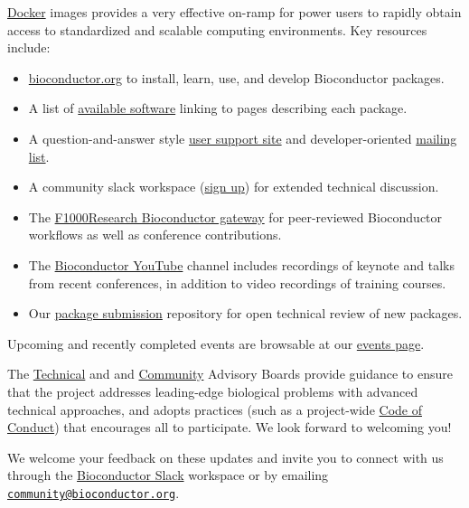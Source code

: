 \href{https://bioconductor.org/help/docker/}{Docker}
images provides a very effective on-ramp for power users to rapidly
obtain access to standardized and scalable computing environments.
Key resources include:

\begin{itemize}
\tightlist
\item
  \href{https://bioconductor.org}{bioconductor.org} to install,
  learn, use, and develop Bioconductor packages.
\item
  A list of \href{https://bioconductor.org/packages}{available software}
  linking to pages describing each package.
\item
  A question-and-answer style
  \href{https://support.bioconductor.org}{user support site} and
  developer-oriented \href{https://stat.ethz.ch/mailman/listinfo/bioc-devel}{mailing list}.
\item
  A community slack workspace (\href{https://slack.bioconductor.org}{sign up})
  for extended technical discussion.
\item
  The \href{https://f1000research.com/gateways/bioconductor}{F1000Research Bioconductor gateway}
  for peer-reviewed Bioconductor workflows as well as conference contributions.
\item
  The \href{https://www.youtube.com/user/bioconductor}{Bioconductor YouTube}
  channel includes recordings of keynote and talks from recent
  conferences, in addition to
  video recordings of training courses.
\item
  Our \href{https://github.com/Bioconductor/Contributions}{package submission}
  repository for open technical review of new packages.
\end{itemize}

Upcoming and recently completed events are browsable at our
\href{https://bioconductor.org/help/events/}{events page}.

The \href{https://bioconductor.org/about/technical-advisory-board/}{Technical}
and and \href{https://bioconductor.org/about/community-advisory-board/}{Community}
Advisory Boards provide guidance to ensure that the project addresses
leading-edge biological problems with advanced technical approaches,
and adopts practices (such as a
project-wide \href{https://bioconductor.org/about/code-of-conduct/}{Code of Conduct})
that encourages all to participate. We look forward to
welcoming you!

We welcome your feedback on these updates and invite you to connect with us through the \href{https://slack.bioconductor.org}{Bioconductor Slack} workspace or by emailing \href{mailto:community@bioconductor.org}{\nolinkurl{community@bioconductor.org}}.


\address{%
Maria Doyle, Bioconductor Community Manager\\
University of Limerick\\%
\\
%
%
%
%
}

\address{%
Bioconductor Core Developer Team\\
Dana-Farber Cancer Institute, Roswell Park Comprehensive Cancer Center, City University of New York, Fred Hutchinson Cancer Research Center, Mass General Brigham\\%
\\
%
%
%
%
}
